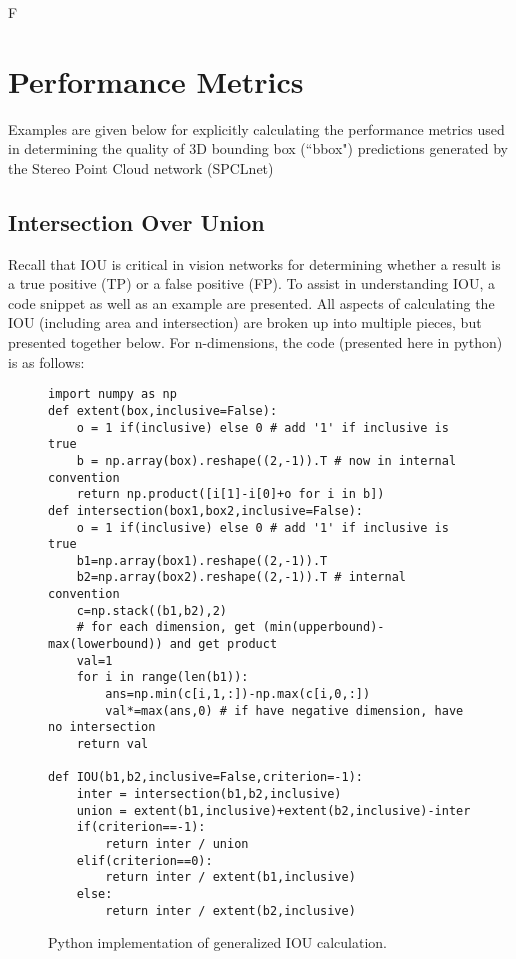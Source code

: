 F%
\section{Performance Metrics}
\label{appendix_metrics}

Examples are given below for explicitly calculating the performance metrics used in determining the quality of 3D bounding box (``bbox") predictions generated by the Stereo Point Cloud network (SPCLnet)

\subsection{Intersection Over Union}
Recall that IOU is critical in vision networks for determining whether a result is a true positive (TP) or a false positive (FP). To assist in understanding IOU, a code snippet as well as an example are presented. All aspects of calculating the IOU (including area and intersection) are broken up into multiple pieces, but presented together below. For n-dimensions, the code (presented here in python) is as follows:

\begin{figure}[ht]
\begin{lstlisting}
import numpy as np
def extent(box,inclusive=False):
    o = 1 if(inclusive) else 0 # add '1' if inclusive is true
    b = np.array(box).reshape((2,-1)).T # now in internal convention
    return np.product([i[1]-i[0]+o for i in b])
def intersection(box1,box2,inclusive=False):
    o = 1 if(inclusive) else 0 # add '1' if inclusive is true
    b1=np.array(box1).reshape((2,-1)).T
    b2=np.array(box2).reshape((2,-1)).T # internal convention
    c=np.stack((b1,b2),2)
    # for each dimension, get (min(upperbound)-max(lowerbound)) and get product
    val=1
    for i in range(len(b1)):
        ans=np.min(c[i,1,:])-np.max(c[i,0,:])
        val*=max(ans,0) # if have negative dimension, have no intersection
    return val

def IOU(b1,b2,inclusive=False,criterion=-1):
    inter = intersection(b1,b2,inclusive)
    union = extent(b1,inclusive)+extent(b2,inclusive)-inter
    if(criterion==-1):
        return inter / union
    elif(criterion==0):
        return inter / extent(b1,inclusive)
    else:
        return inter / extent(b2,inclusive)

\end{lstlisting}
\onehalfspacing %
\caption{Python implementation of generalized IOU calculation.}
\label{code_iou}
\end{figure}

